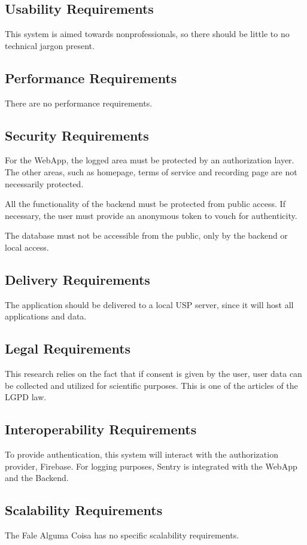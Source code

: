\subsection{Usability Requirements}

This system is aimed towards nonprofessionals, so there should be little to no technical jargon present.

\subsection{Performance Requirements}

There are no performance requirements.

\subsection{Security Requirements}

For the WebApp, the logged area must be protected by an authorization layer. The other areas, such as homepage, terms of service and recording page are not necessarily protected.

All the functionality of the backend must be protected from public access. If necessary, the user must provide an anonymous token to vouch for authenticity.

The database must not be accessible from the public, only by the backend or local access.

\subsection{Delivery Requirements}

The application should be delivered to a local USP server, since it will host all applications and data.

\subsection{Legal Requirements}

This research relies on the fact that if consent is given by the user, user data can be collected and utilized for scientific purposes. This is one of the articles of the LGPD law.

\subsection{Interoperability Requirements}

To provide authentication, this system will interact with the authorization provider, Firebase. For logging purposes, Sentry is integrated with the WebApp and the Backend.

\subsection{Scalability Requirements}

The Fale Alguma Coisa has no specific scalability requirements.